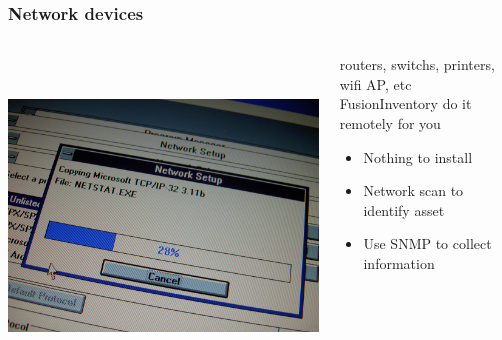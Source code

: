 \documentclass{beamer}
\begin{document}
\begin{frame}

    \frametitle{Network devices}


 \begin{columns}
 \begin{column}{0.15\textwidth}
         \includegraphics[height=8.5cm]{./pics/networking.jpg}
 \end{column}
 \begin{column}{1.25\textwidth}
    

    \begin{block}{routers, switchs, printers, wifi AP, etc \\
    FusionInventory do it remotely for you}
        \begin{itemize}
            \item Nothing to install
            \item Network scan to identify asset
            \item Use SNMP to collect information
        \end{itemize}
    \end{block}

 \end{column}
\end{columns}
\end{frame}
\end{document}
